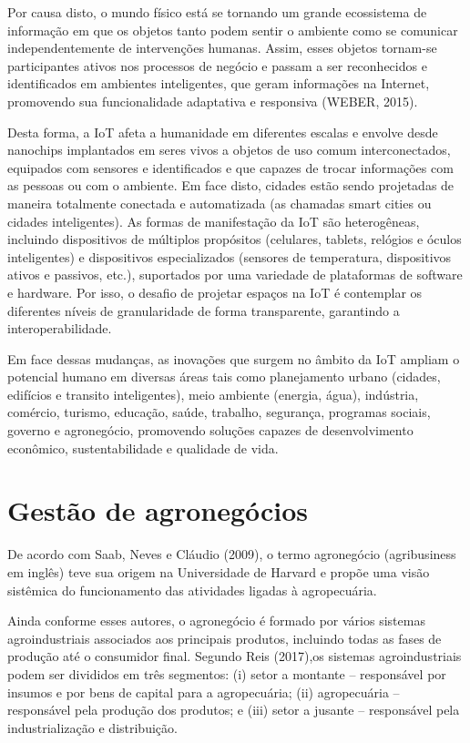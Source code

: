 \documentclass[eso]{bcc}
\begin{document}
Por causa disto, o mundo físico está se tornando um grande ecossistema de informação em que 
os objetos tanto podem sentir o ambiente como se comunicar independentemente de intervenções humanas. 
Assim, esses objetos tornam-se participantes ativos nos processos de negócio e passam a ser 
reconhecidos e identificados em ambientes inteligentes, que geram informações na Internet, 
promovendo sua funcionalidade adaptativa e responsiva (WEBER, 2015).

Desta forma, a IoT afeta a humanidade em diferentes escalas e envolve desde nanochips implantados 
em seres vivos a objetos de uso comum interconectados, equipados com sensores e identificados 
e que capazes de trocar informações com as pessoas ou com o ambiente. Em face disto, cidades 
estão sendo projetadas de maneira totalmente conectada e automatizada (as chamadas smart cities 
ou cidades inteligentes). As formas de manifestação da IoT são heterogêneas, incluindo dispositivos 
de múltiplos propósitos (celulares, tablets, relógios e óculos inteligentes) e dispositivos 
especializados (sensores de temperatura, dispositivos ativos e passivos, etc.), suportados por 
uma variedade de plataformas de software e hardware. Por isso, o desafio de projetar espaços na 
IoT é contemplar os diferentes níveis de granularidade de forma transparente, garantindo a 
interoperabilidade.

Em face dessas mudanças, as inovações que surgem no âmbito da IoT ampliam o potencial humano 
em diversas áreas tais como planejamento urbano (cidades, edifícios e transito inteligentes), 
meio ambiente (energia, água), indústria, comércio, turismo, educação, saúde, trabalho, 
segurança, programas sociais, governo e agronegócio, promovendo soluções capazes de 
desenvolvimento econômico, sustentabilidade e qualidade de vida.

\section{Gestão de agronegócios}
De acordo com Saab, Neves e Cláudio (2009), o termo agronegócio (agribusiness em inglês) teve 
sua origem na Universidade de Harvard e propõe uma visão sistêmica do funcionamento das atividades 
ligadas à agropecuária.

Ainda conforme esses autores, o agronegócio é formado por vários sistemas agroindustriais  
associados  aos  principais  produtos,  incluindo  todas  as  fases  de  produção até o 
consumidor final. Segundo Reis (2017),os sistemas agroindustriais podem ser divididos em 
três segmentos: (i) setor a montante – responsável por insumos e por bens de capital para a agropecuária; 
(ii) agropecuária – responsável pela produção dos produtos; e 
(iii) setor a jusante – responsável pela industrialização e distribuição.
\end{document}
